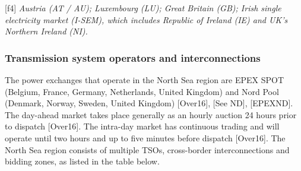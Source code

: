{[}f4{]} \emph{Austria (AT / AU); Luxembourg (LU); Great Britain (GB);
Irish single electricity market (I-SEM), which includes Republic of
Ireland (IE) and UK's Northern Ireland (NI).}

\hypertarget{transmission-system-operators-and-interconnections}{%
\subsubsection{Transmission system operators and
interconnections}\label{transmission-system-operators-and-interconnections}}

The power exchanges that operate in the North Sea region are EPEX SPOT
(Belgium, France, Germany, Netherlands, United Kingdom) and Nord Pool
(Denmark, Norway, Sweden, United Kingdom) {[}Over16{]}, {[}See ND{]},
{[}EPEXND{]}. The day-ahead market takes place generally as an hourly
auction 24 hours prior to dispatch {[}Over16{]}. The intra-day market
has continuous trading and will operate until two hours and up to five
minutes before dispatch {[}Over16{]}. The North Sea region consists of
multiple TSOs, cross-border interconnections and bidding zones, as
listed in the table below.

